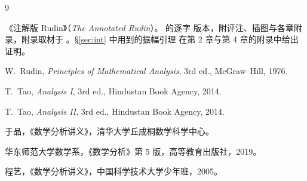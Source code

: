 \begin{thebibliography}{9}

《注解版 Rudin》（\emph{The Annotated Rudin}）。\cite{rudin} 的逐字
版本，附评注、插图与各章附录，附录取材于
\cite{taoI,taoII,yupin,ecnu,ustc}。\S\ref{sec:int} 中用到的振幅引理
在第 2 章与第 4 章的附录中给出证明。

W.~Rudin, \emph{Principles of Mathematical Analysis}, 3rd ed.,
McGraw--Hill, 1976.

T.~Tao, \emph{Analysis I}, 3rd ed., Hindustan Book Agency, 2014.

T.~Tao, \emph{Analysis II}, 3rd ed., Hindustan Book Agency, 2014.

于品，《数学分析讲义》，清华大学丘成桐数学科学中心。

华东师范大学数学系，《数学分析》第 5 版，高等教育出版社，2019。

程艺，《数学分析讲义》，中国科学技术大学少年班，2005。

\end{thebibliography}
